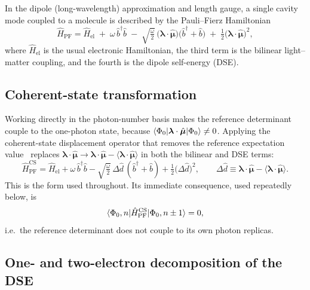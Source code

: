 \documentclass[11pt]{article}
\newcommand{\lam}{\bm{\lambda}}
\newcommand{\Hpf}{\hat{H}_{\mathrm{PF}}}
\newcommand{\bd}{\hat{b}^{\dagger}}
\newcommand{\bo}{\hat{b}}
\begin{document}
In the dipole (long-wavelength) approximation and length gauge, a single cavity
mode coupled to a molecule is described by the Pauli--Fierz
Hamiltonian~\cite{Haugland2020, DePrince2021}
\begin{equation}
\Hpf
= \hat{H}_{\mathrm{el}}
\;+\; \omega\,\bd\bo
\;-\; \sqrt{\tfrac{\omega}{2}}\,
      \bigl(\lam\cdot\hat{\bm{\mu}}\bigr)\bigl(\bd + \bo\bigr)
\;+\; \tfrac{1}{2}\bigl(\lam\cdot\hat{\bm{\mu}}\bigr)^{2},
\label{eq:PF}
\end{equation}
where $\hat{H}_{\mathrm{el}}$ is the usual electronic Hamiltonian, the third
term is the bilinear light--matter coupling, and the fourth is the dipole
self-energy (DSE).

\subsection{Coherent-state transformation}

Working directly in the photon-number basis makes the reference determinant
couple to the one-photon state, because
$\braket{\Phi_0 | \lam\cdot\hat{\bm{\mu}} | \Phi_0} \ne 0$. Applying the
coherent-state displacement operator that removes the reference expectation
value~\cite{Haugland2020, McTague2022} replaces
$\lam\cdot\hat{\bm{\mu}} \to \lam\cdot\hat{\bm{\mu}} - \langle \lam\cdot\hat{\bm{\mu}}\rangle$
in both the bilinear and DSE terms:
\begin{equation}
\Hpf^{\mathrm{CS}}
= \hat{H}_{\mathrm{el}}
+ \omega\,\bd\bo
- \sqrt{\tfrac{\omega}{2}}\,\Delta\hat{d}\,(\bd + \bo)
+ \tfrac{1}{2}\bigl(\Delta\hat{d}\bigr)^{2},
\qquad
\Delta\hat{d} \equiv \lam\cdot\hat{\bm{\mu}} - \langle\lam\cdot\hat{\bm{\mu}}\rangle .
\label{eq:PFCS}
\end{equation}
This is the form used throughout. Its immediate consequence, used repeatedly
below, is
\begin{equation}
\braket{\Phi_0, n | \Hpf^{\mathrm{CS}} | \Phi_0, n\pm1} = 0 ,
\label{eq:refref}
\end{equation}
i.e.\ the reference determinant does not couple to its own photon replicas.

\subsection{One- and two-electron decomposition of the DSE}
\label{sec:dsedecomp}
\end{document}
